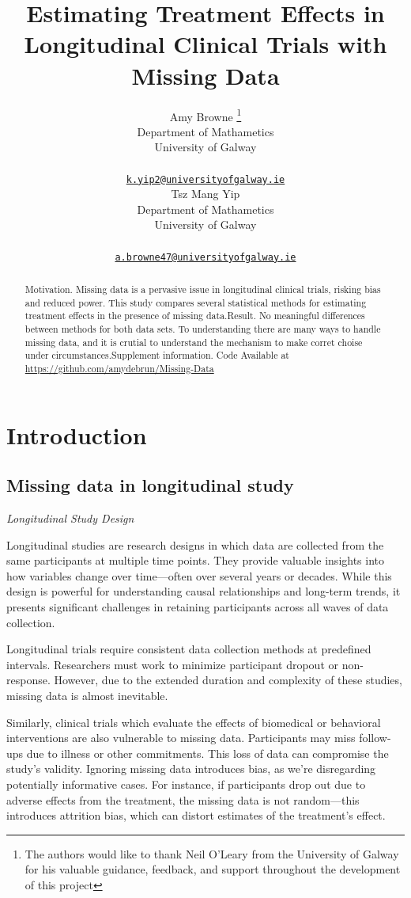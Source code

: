 \documentclass{article}
\title{Estimating Treatment Effects in Longitudinal Clinical Trials with
Missing Data}
\author{
    Amy Browne
    \thanks{The authors would like to thank Neil O'Leary from the
University of Galway for his valuable guidance, feedback, and support
throughout the development of this project}
   \\
    Department of Mathametics \\
    University of Galway \\
   \\
  \texttt{\href{mailto:k.yip2@universityofgalway.ie}{\nolinkurl{k.yip2@universityofgalway.ie}}} \\
   \And
    Tsz Mang Yip
   \\
    Department of Mathametics \\
    University of Galway \\
   \\
  \texttt{\href{mailto:a.browne47@universityofgalway.ie}{\nolinkurl{a.browne47@universityofgalway.ie}}} \\
  }
\begin{document}
\maketitle


\begin{abstract}
Motivation. Missing data is a pervasive issue in longitudinal clinical
trials, risking bias and reduced power. This study compares several
statistical methods for estimating treatment effects in the presence of
missing data.Result. No meaningful differences between methods for both
data sets. To understanding there are many ways to handle missing data,
and it is crutial to understand the mechanism to make corret choise
under circumstances.Supplement information. Code Available at
\url{https://github.com/amydebrun/Missing-Data}
\end{abstract}


\section{Introduction}\label{introduction}

\subsection{Missing data in longitudinal
study}\label{missing-data-in-longitudinal-study}

\emph{Longitudinal Study Design}

Longitudinal studies are research designs in which data are collected
from the same participants at multiple time points. They provide
valuable insights into how variables change over time---often over
several years or decades. While this design is powerful for
understanding causal relationships and long-term trends, it presents
significant challenges in retaining participants across all waves of
data collection.

Longitudinal trials require consistent data collection methods at
predefined intervals. Researchers must work to minimize participant
dropout or non-response. However, due to the extended duration and
complexity of these studies, missing data is almost inevitable.

Similarly, clinical trials which evaluate the effects of biomedical or
behavioral interventions are also vulnerable to missing data.
Participants may miss follow-ups due to illness or other commitments.
This loss of data can compromise the study's validity. Ignoring missing
data introduces bias, as we're disregarding potentially informative
cases. For instance, if participants drop out due to adverse effects
from the treatment, the missing data is not random---this introduces
attrition bias, which can distort estimates of the treatment's effect.
\end{document}
